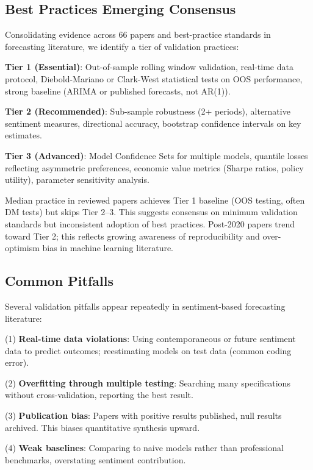 \documentclass[11pt]{article}
\begin{document}
\subsection{Best Practices Emerging Consensus}

Consolidating evidence across 66 papers and best-practice standards in forecasting literature, we identify a tier of validation practices:

\textbf{Tier 1 (Essential)}: Out-of-sample rolling window validation, real-time data protocol, Diebold-Mariano or Clark-West statistical tests on OOS performance, strong baseline (ARIMA or published forecasts, not AR(1)).

\textbf{Tier 2 (Recommended)}: Sub-sample robustness (2+ periods), alternative sentiment measures, directional accuracy, bootstrap confidence intervals on key estimates.

\textbf{Tier 3 (Advanced)}: Model Confidence Sets for multiple models, quantile losses reflecting asymmetric preferences, economic value metrics (Sharpe ratios, policy utility), parameter sensitivity analysis.

Median practice in reviewed papers achieves Tier 1 baseline (OOS testing, often DM tests) but skips Tier 2--3. This suggests consensus on minimum validation standards but inconsistent adoption of best practices. Post-2020 papers trend toward Tier 2; this reflects growing awareness of reproducibility and over-optimism bias in machine learning literature.

\subsection{Common Pitfalls}

Several validation pitfalls appear repeatedly in sentiment-based forecasting literature:

\noindent
(1) \textbf{Real-time data violations}: Using contemporaneous or future sentiment data to predict outcomes; reestimating models on test data (common coding error). 

\noindent
(2) \textbf{Overfitting through multiple testing}: Searching many specifications without cross-validation, reporting the best result.

\noindent
(3) \textbf{Publication bias}: Papers with positive results published, null results archived. This biases quantitative synthesis upward.

\noindent
(4) \textbf{Weak baselines}: Comparing to naive models rather than professional benchmarks, overstating sentiment contribution.
\end{document}
